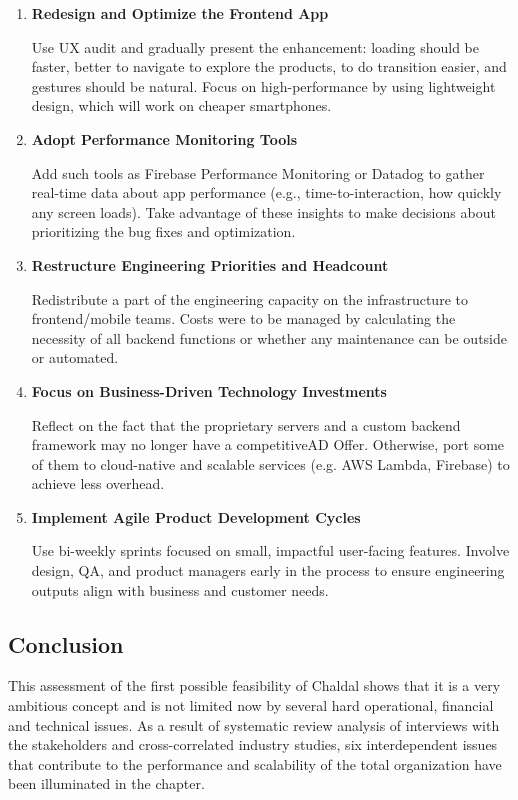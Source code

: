 \documentclass[12pt,a4paper]{article}
\begin{document}
\begin{enumerate}
    \item \textbf{Redesign and Optimize the Frontend App}
    
Use UX audit and gradually present the enhancement: loading should be faster, better to navigate to explore the products, to do transition easier, and gestures should be natural. Focus on high-performance by using lightweight design, which will work on cheaper smartphones.    
    \item \textbf{Adopt Performance Monitoring Tools}
    
Add such tools as Firebase Performance Monitoring or Datadog to gather real-time data about app performance (e.g., time-to-interaction, how quickly any screen loads). Take advantage of these insights to make decisions about prioritizing the bug fixes and optimization.    
    \item \textbf{Restructure Engineering Priorities and Headcount}
    
     Redistribute a part of the engineering capacity on the infrastructure to frontend/mobile teams. Costs were to be managed by calculating the necessity of all backend functions or whether any maintenance can be outside or automated.
    \item \textbf{Focus on Business-Driven Technology Investments}
    
   Reflect on the fact that the proprietary servers and a custom backend framework may no longer have a competitiveAD Offer. Otherwise, port some of them to cloud-native and scalable services (e.g. AWS Lambda, Firebase) to achieve less overhead.
   \item \textbf{Implement Agile Product Development Cycles}
    
 Use bi-weekly sprints focused on small, impactful user-facing features. Involve design, QA, and product managers early in the process to ensure engineering outputs align with business and customer needs.\end{enumerate}

\subsection{Conclusion}

This assessment of the first possible feasibility of Chaldal shows that it is a very ambitious concept and is not limited now by several hard operational, financial and technical issues. As a result of systematic review analysis of interviews with the stakeholders and cross-correlated industry studies, six interdependent issues that contribute to the performance and scalability of the total organization have been illuminated in the chapter.
\end{document}
